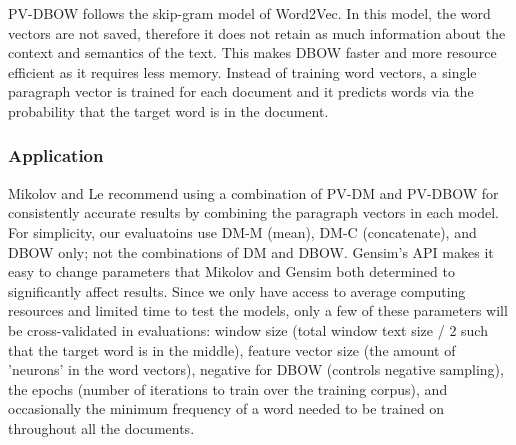 PV-DBOW follows the skip-gram model of Word2Vec. In this model, the word vectors are not saved, therefore it does not retain as much information about the context and semantics of the text. This makes DBOW faster and more resource efficient as it requires less memory. Instead of training word vectors, a single paragraph vector is trained for each document and it predicts words via the probability that the target word is in the document.

\subsubsection{Application}

Mikolov and Le recommend using a combination of PV-DM and PV-DBOW for consistently accurate results by combining the paragraph vectors in each model. \cite{RefWorks:doc:5a6e5746e4b0d609eec798d7} For simplicity, our evaluatoins use DM-M (mean), DM-C (concatenate), and DBOW only; not the combinations of DM and DBOW. Gensim's API makes it easy to change parameters that Mikolov and Gensim both determined to significantly affect results. \cite{RefWorks:doc:5aa698a1e4b0dae9a96dde2d} \cite{RefWorks:doc:5a6e5746e4b0d609eec798d7} Since we only have access to average computing resources and limited time to test the models, only a few of these parameters will be cross-validated in evaluations: window size (total window text size / 2 such that the target word is in the middle), feature vector size (the amount of 'neurons' in the word vectors), negative for DBOW (controls negative sampling), the epochs (number of iterations to train over the training corpus), and occasionally the minimum frequency of a word needed to be trained on throughout all the documents.



